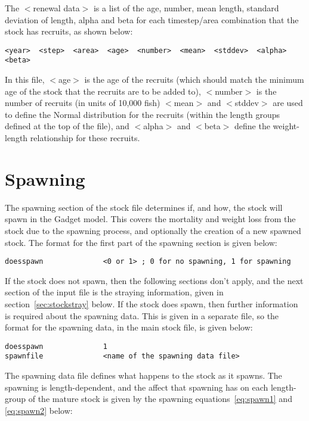 \documentclass [a4paper, 10pt]{book}
\begin{document}
\bigskip
The $<$renewal data$>$ is a list of the age, number, mean length, standard deviation of length, alpha and beta for each timestep/area combination that the stock has recruits, as shown below:

{\small\begin{verbatim}
<year>  <step>  <area>  <age>  <number>  <mean>  <stddev>  <alpha>  <beta>
\end{verbatim}}

In this file, $<$age$>$ is the age of the recruits (which should match the minimum age of the stock that the recruits are to be added to), $<$number$>$ is the number of recruits (in units of 10,000 fish) $<$mean$>$ and $<$stddev$>$ are used to define the Normal distribution for the recruits (within the length groups defined at the top of the file), and $<$alpha$>$ and $<$beta$>$ define the weight-length relationship for these recruits.

\section{Spawning}\label{sec:stockspawn}
The spawning section of the stock file determines if, and how, the stock will spawn in the Gadget model.   This covers the mortality and weight loss from the stock due to the spawning process, and optionally the creation of a new spawned stock.  The format for the first part of the spawning section is given below:

{\small\begin{verbatim}
doesspawn              <0 or 1> ; 0 for no spawning, 1 for spawning
\end{verbatim}}

If the stock does not spawn, then the following sections don't apply, and the next section of the input file is the straying information, given in section~\ref{sec:stockstray} below.  If the stock does spawn, then further information is required about the spawning data.  This is given in a separate file, so the format for the spawning data, in the main stock file, is given below:

{\small\begin{verbatim}
doesspawn              1
spawnfile              <name of the spawning data file>
\end{verbatim}}

The spawning data file defines what happens to the stock as it spawns.  The spawning is length-dependent, and the affect that spawning has on each length-group of the mature stock is given by the spawning equations~\ref{eq:spawn1} and \ref{eq:spawn2} below:
\end{document}

